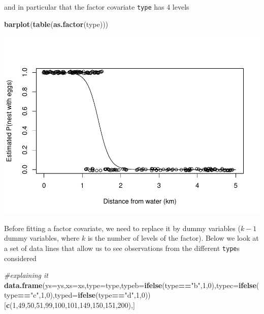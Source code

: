 \documentclass[
]{book}
\newenvironment{Shaded}{\begin{snugshade}}{\end{snugshade}}
\newcommand{\AttributeTok}[1]{\textcolor[rgb]{0.13,0.29,0.53}{#1}}
\newcommand{\CommentTok}[1]{\textcolor[rgb]{0.56,0.35,0.01}{\textit{#1}}}
\newcommand{\DecValTok}[1]{\textcolor[rgb]{0.00,0.00,0.81}{#1}}
\newcommand{\FunctionTok}[1]{\textcolor[rgb]{0.13,0.29,0.53}{\textbf{#1}}}
\newcommand{\NormalTok}[1]{#1}
\newcommand{\SpecialCharTok}[1]{\textcolor[rgb]{0.81,0.36,0.00}{\textbf{#1}}}
\newcommand{\StringTok}[1]{\textcolor[rgb]{0.31,0.60,0.02}{#1}}
\begin{document}
and in particular that the factor covariate \texttt{type} has 4 levels

\begin{Shaded}
\begin{Highlighting}[]
\FunctionTok{barplot}\NormalTok{(}\FunctionTok{table}\NormalTok{(}\FunctionTok{as.factor}\NormalTok{(type)))}
\end{Highlighting}
\end{Shaded}

\includegraphics{ECOMODbook_files/figure-latex/unnamed-chunk-4-1.pdf}

Before fitting a factor covariate, we need to replace it by dummy variables (\(k-1\) dummy variables, where \(k\) is the number of levels of the factor). Below we look at a set of data lines that allow us to see observations from the different \texttt{type}s considered

\begin{Shaded}
\begin{Highlighting}[]
\CommentTok{\#explaining it}
\FunctionTok{data.frame}\NormalTok{(}\AttributeTok{ys=}\NormalTok{ys,}\AttributeTok{xs=}\NormalTok{xs,}\AttributeTok{type=}\NormalTok{type,}\AttributeTok{typeb=}\FunctionTok{ifelse}\NormalTok{(type}\SpecialCharTok{==}\StringTok{"b"}\NormalTok{,}\DecValTok{1}\NormalTok{,}\DecValTok{0}\NormalTok{),}\AttributeTok{typec=}\FunctionTok{ifelse}\NormalTok{(type}\SpecialCharTok{==}\StringTok{"c"}\NormalTok{,}\DecValTok{1}\NormalTok{,}\DecValTok{0}\NormalTok{),}\AttributeTok{typed=}\FunctionTok{ifelse}\NormalTok{(type}\SpecialCharTok{==}\StringTok{"d"}\NormalTok{,}\DecValTok{1}\NormalTok{,}\DecValTok{0}\NormalTok{))[}\FunctionTok{c}\NormalTok{(}\DecValTok{1}\NormalTok{,}\DecValTok{49}\NormalTok{,}\DecValTok{50}\NormalTok{,}\DecValTok{51}\NormalTok{,}\DecValTok{99}\NormalTok{,}\DecValTok{100}\NormalTok{,}\DecValTok{101}\NormalTok{,}\DecValTok{149}\NormalTok{,}\DecValTok{150}\NormalTok{,}\DecValTok{151}\NormalTok{,}\DecValTok{200}\NormalTok{),]}
\end{Highlighting}
\end{Shaded}
\end{document}
